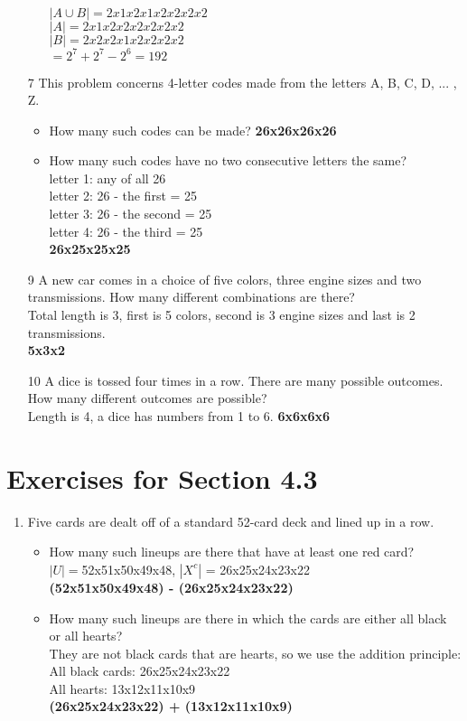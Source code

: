 \documentclass[12pt]{article}
\begin{document}
\begin{enumerate}
\begin{itemize}
		$|A\cup B| = 2x1x2x1x2x2x2x2$\\
		$|A| = 2x1x2x2x2x2x2x2$\\
		$|B| = 2x2x2x1x2x2x2x2$\\
		$= 2^7 + 2^7 - 2^6 = 192$
	\end{itemize}
    \item [7] This problem concerns 4-letter codes made from the letters A, B, C, D, ... , Z.
	\begin{itemize}
	    \item How many such codes can be made? \textbf{26x26x26x26}
	    \item How many such codes have no two consecutive letters the same?\\
		letter 1: any of all 26\\
		letter 2: 26 - the first = 25\\
		letter 3: 26 - the second = 25\\
		letter 4: 26 - the third = 25\\
		\textbf{26x25x25x25}
	\end{itemize}
    \item [9] A new car comes in a choice of five colors, three engine sizes and two transmissions. How many different combinations are there?\\
	Total length is 3, first is 5 colors, second is 3 engine sizes and last is 2 transmissions.\\
	\textbf{5x3x2}
    \item [10] A dice is tossed four times in a row. There are many possible outcomes. How many different outcomes are possible?\\
	Length is 4, a dice has numbers from 1 to 6. \textbf{6x6x6x6}
\end{enumerate}
\section*{Exercises for Section 4.3}
\begin{enumerate}
    \item Five cards are dealt off of a standard 52-card deck and lined up in a row.
	\begin{itemize}
		\item How many such lineups are there that have at least one red card?\\
		    $|U| = $52x51x50x49x48, $|X^c|$ = 26x25x24x23x22\\
		    \textbf{(52x51x50x49x48) - (26x25x24x23x22)}
		\item How many such lineups are there in which the cards are either all black or all hearts?\\
		    They are not black cards that are hearts, so we use the addition principle:\\
		    All black cards: 26x25x24x23x22\\
		    All hearts: 13x12x11x10x9\\
		    \textbf{(26x25x24x23x22) + (13x12x11x10x9)}
	\end{itemize}
\end{enumerate}
\end{document}
